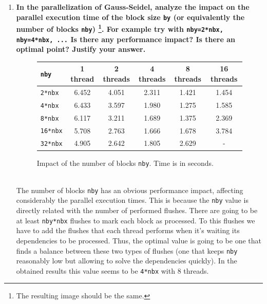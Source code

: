 \documentclass[a4paper,11pt]{article}
\begin{document}
\begin{enumerate}
\clearpage
\item
\textbf{In the parallelization of Gauss-Seidel, analyze the impact on
  the parallel execution time of the block size \texttt{by} (or
  equivalently the number of blocks \texttt{nby})
    \footnote{The resulting image should be the same.}. For example
    try with \texttt{nby=2*nbx, nby=4*nbx, ...} Is there any
    performance impact? Is there an optimal point?  Justify your
    answer.}
\begin{figure}[h!]
\begin{tabular}{| l || c | c | c | c | c |}
\hline
\textbf{\texttt{nby}} & \textbf{1 thread} & \textbf{2 threads} & \textbf{4 threads} & \textbf{8 threads} & \textbf{16 threads}
\\
\hline
\hline
\texttt{2*nbx} & 6.452 & 4.051 & 2.311 & 1.421 & 1.454
\\
\hline
\texttt{4*nbx} & 6.433 & 3.597 & 1.980 & 1.275 & 1.585
\\
\hline
\texttt{8*nbx} & 6.117 & 3.211 & 1.689 & 1.375 & 2.369
\\
\hline
\texttt{16*nbx} & 5.708 & 2.763 & 1.666 & 1.678 & 3.784
\\
\hline
\texttt{32*nbx} & 4.905 & 2.642 & 1.805 & 2.629 & -
\\
\hline
\end{tabular}
\caption{Impact of the number of blocks \texttt{nby}. Time is in seconds.}
\end{figure}
\\
The number of blocks \texttt{nby} has an obvious performance
impact, affecting considerably the parallel execution times. This is
because the \texttt{nby} value is directly related with the number of
performed flushes. There are going to be at least \texttt{nby*nbx}
flushes to mark each block as processed. To this flushes we have to
add the flushes that each thread performs when it's waiting its
dependencies to be processed. Thus, the optimal value is going to be
one that finds a balance between these two types of flushes (one that
keeps \texttt{nby} reasonably low but allowing to solve the
dependencies quickly). In the obtained results this value seems to be
\texttt{4*nbx} with $8$ threads.
\end{enumerate}
\end{document}
